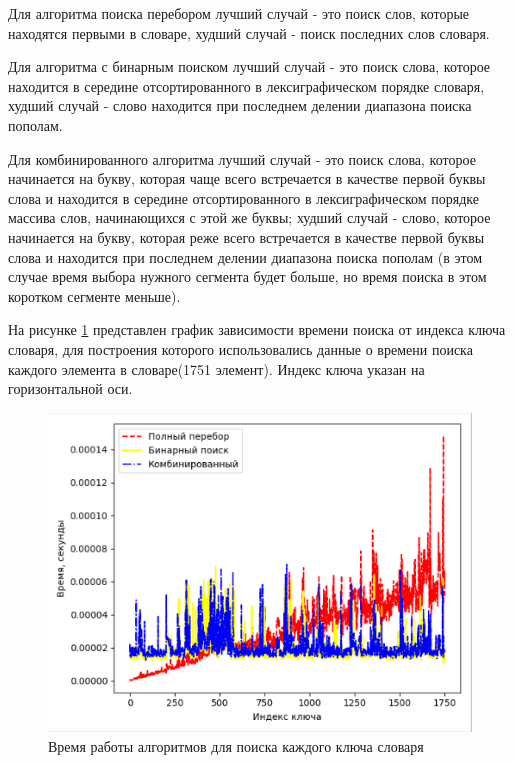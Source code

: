 \documentclass[12pt]{report}
\begin{document}
Для алгоритма поиска перебором лучший случай - это поиск слов, которые находятся первыми в словаре, худший случай - поиск последних слов словаря.

Для алгоритма с бинарным поиском лучший случай - это поиск слова, которое находится в середине отсортированного в лексиграфическом порядке словаря, худший случай - слово находится при последнем делении диапазона поиска пополам.

Для комбинированного алгоритма лучший случай - это поиск слова, которое начинается на букву, которая чаще всего встречается в качестве первой буквы слова и находится в середине отсортированного в лексиграфическом порядке массива слов, начинающихся с этой же буквы; худший случай - слово, которое начинается на букву, которая реже всего встречается в качестве первой буквы слова и  находится при последнем делении диапазона поиска пополам (в этом случае время выбора нужного сегмента будет больше, но время поиска в этом коротком сегменте меньше).

На рисунке \ref{fig:time3} представлен график зависимости времени поиска от индекса ключа словаря, для построения которого использовались данные о времени поиска каждого элемента в словаре(1751 элемент). Индекс ключа указан на горизонтальной оси.

\begin{figure}[h]
	\begin{center}
		\includegraphics[scale=0.6]{time3.png}
		\caption{Время работы алгоритмов для поиска каждого ключа словаря}
		\label{fig:time3}
	\end{center}
\end{figure}
\end{document}
